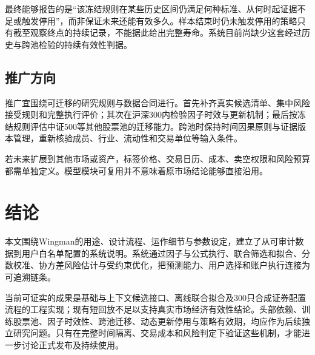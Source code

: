 \documentclass[UTF8,12pt,a4paper,fontset=none]{ctexart}
\begin{document}
最终能够报告的是“该冻结规则在某些历史区间仍满足何种标准、从何时起证据不足或触发停用”，而非保证未来还能有效多久。样本结束时仍未触发停用的策略只有截至观察终点的持续记录，不能据此给出完整寿命。系统目前尚缺少这套经过历史与跨池检验的持续有效性判据。


\subsection{推广方向}

推广宜围绕可迁移的研究规则与数据合同进行。首先补齐真实候选清单、集中风险接受规则和完整执行评价；其次在沪深300内检验因子时效与更新机制；最后按冻结规则评估中证500等其他股票池的迁移能力。跨池时保持时间因果原则与证据版本管理，重新核验成员、行业、流动性和交易单位等输入条件。


若未来扩展到其他市场或资产，标签价格、交易日历、成本、卖空权限和风险预算都需单独定义。模型模块可复用并不意味着原市场结论能够直接沿用。


\section{结论}

本文围绕Wingman的用途、设计流程、运作细节与参数设定，建立了从可审计数据到用户白名单配置的系统说明。系统通过因子与公式执行、联合筛选和拟合、分数校准、协方差风险估计与受约束优化，把预测能力、用户选择和账户执行连接为可追溯链条。


当前可证实的成果是基础与上下文候选接口、离线联合拟合及300只合成证券配置流程的工程实现；现有短回放不足以支持真实市场经济有效性结论。头部依赖、训练股票池、因子时效性、跨池迁移、动态更新停用与策略有效期，均应作为后续独立研究问题。只有在完整时间隔离、交易成本和风险判定下验证这些机制，才能进一步讨论正式发布及持续使用。
\end{document}
